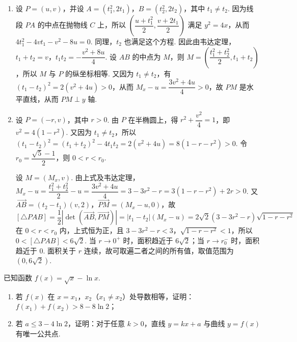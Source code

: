 \begin{solution}
\begin{enumerate}
  \item 设 \(P=(u,v)\)，并设 \(A=(t_1^2,2t_1)\)，\(B=(t_2^2,2t_2)\)，其中 \(t_1\ne t_2\). 因为线段 \(PA\) 的中点在抛物线 \(C\) 上，所以 \(\left(\dfrac{u+t_1^2}{2},\dfrac{v+2t_1}{2}\right)\) 满足 \(y^2=4x\)，从而 \(4t_1^2-4vt_1-v^2-8u=0\). 同理，\(t_2\) 也满足这个方程. 因此由韦达定理，\(t_1+t_2=v\)，\(t_1t_2=-\dfrac{v^2+8u}{4}\). 设 \(AB\) 的中点为 \(M\)，则 \(M=\left(\dfrac{t_1^2+t_2^2}{2},t_1+t_2\right)\)，所以 \(M\) 与 \(P\) 的纵坐标相等. 又因为 \(t_1\ne t_2\)，有 \((t_1-t_2)^2=2(v^2+4u)>0\)，从而 \(M_x-u=\dfrac{3v^2+4u}{4}>0\)，故 \(PM\) 是水平直线，从而 \(PM\perp y\) 轴.
  \item 设 \(P=(-r,v)\)，其中 \(r>0\). 由 \(P\) 在半椭圆上，得 \(r^2+\dfrac{v^2}{4}=1\)，即 \(v^2=4(1-r^2)\). 又因为 \(t_1\ne t_2\)，所以 \((t_1-t_2)^2=(t_1+t_2)^2-4t_1t_2=2(v^2+4u)=8(1-r-r^2)>0\). 令 \(r_0=\dfrac{\sqrt5-1}{2}\)，则 \(0<r<r_0\).

  设 \(M=(M_x,v)\). 由上式及韦达定理，\(M_x-u=\dfrac{t_1^2+t_2^2}{2}-u=\dfrac{3v^2+4u}{4}=3-3r^2-r=3(1-r-r^2)+2r>0\). 又 \(\overrightarrow{AB}=(t_2-t_1)(v,2)\)，\(\overrightarrow{PM}=(M_x-u,0)\)，故
  \[
  [\triangle PAB]=\frac12\left|\det\left(\overrightarrow{AB},\overrightarrow{PM}\right)\right|=|t_1-t_2|(M_x-u)=2\sqrt2(3-3r^2-r)\sqrt{1-r-r^2}
  \]
  在 \(0<r<r_0\) 内，上式恒为正，且 \(3-3r^2-r<3\)，\(\sqrt{1-r-r^2}<1\)，所以 \(0<[\triangle PAB]<6\sqrt2\). 当 \(r\to0^+\) 时，面积趋近于 \(6\sqrt2\)；当 \(r\to r_0^-\) 时，面积趋近于 \(0\). 面积关于 \(r\) 连续，故可取遍二者之间的所有值，取值范围为 \((0,6\sqrt2)\).
\end{enumerate}
\end{solution}

\begin{problem}
已知函数 \(f(x)=\sqrt{x}-\ln x\).

\begin{enumerate}
  \item 若 \(f(x)\) 在 \(x=x_1\)，\(x_2\)（\(x_1\ne x_2\)）处导数相等，证明：\(f(x_1)+f(x_2)>8-8\ln2\)；
  \item 若 \(a\le3-4\ln2\)，证明：对于任意 \(k>0\)，直线 \(y=kx+a\) 与曲线 \(y=f(x)\) 有唯一公共点.
\end{enumerate}
\end{problem}

